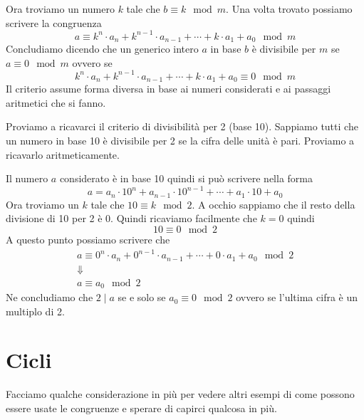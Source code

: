 Ora troviamo un numero $k$ tale che $b \equiv k \mod{m}$. Una volta trovato possiamo scrivere
la congruenza
\begin{equation*}
	a \equiv k^n \cdot a_n + k^{n-1} \cdot a_{n-1} + \cdots + k \cdot a_1 + a_0 \mod{m}
\end{equation*}
Concludiamo dicendo che un generico intero $a$ in base $b$ \`e divisibile per $m$ se
$a \equiv 0 \mod{m}$ ovvero se
\begin{equation*}
	k^n \cdot a_n + k^{n-1} \cdot a_{n-1} + \cdots + k \cdot a_1 + a_0 \equiv 0 \mod{m}
\end{equation*}
Il criterio assume forma diversa in base ai numeri considerati e ai passaggi aritmetici che
si fanno.

\begin{example}
	Proviamo a ricavarci il criterio di divisibilit\`a per 2 (base 10). Sappiamo tutti che un
	numero in base 10 \`e divisibile per 2 se la cifra delle unit\`a \`e pari. Proviamo a
	ricavarlo aritmeticamente.

	Il numero $a$ considerato \`e in base 10 quindi si pu\`o scrivere nella forma
	\begin{equation*}
		a = a_n \cdot 10^n + a_{n-1} \cdot 10^{n - 1} + \cdots + a_1 \cdot 10 + a_0
	\end{equation*}
	Ora troviamo un $k$ tale che $10 \equiv k \mod{2}$. A occhio sappiamo che il resto della
	divisione di 10 per 2 \`e 0. Quindi ricaviamo facilmente che $k = 0$ quindi
	\begin{equation*}
		10 \equiv 0 \mod{2}
	\end{equation*}
	A questo punto possiamo scrivere che
	\begin{equation*}
		\begin{array}{c}
			a \equiv 0^n \cdot a_n + 0^{n-1} \cdot a_{n-1} +
			\cdots + 0 \cdot a_1 + a_0 \mod{2} \\
			\Downarrow                         \\
			a \equiv a_0 \mod{2}
		\end{array}
	\end{equation*}
	Ne concludiamo che $2 \mid a$ se e solo se $a_0 \equiv 0 \mod{2}$ ovvero se l'ultima cifra
	\`e un multiplo di 2.
\end{example}

\section{Cicli}
Facciamo qualche considerazione in pi\`u per vedere altri esempi di come possono essere usate
le congruenze e sperare di capirci qualcosa in pi\`u.

